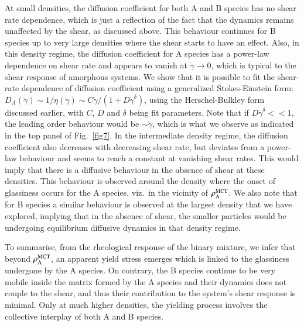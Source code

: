 At small densities, the diffusion coefficient for both A and B species has no shear rate dependence, which is just a reflection of the fact that the dynamics remains unaffected by the shear, as discussed above. This behaviour continues for B species up to very large densities where the shear starts to have an effect.  Also, in this density regime, the diffusion coefficient for A species has a power-law dependence on shear rate and appears to vanish at $\dot{\gamma} \rightarrow 0$, which is typical to the shear response of amorphous systems. We show that it is possible to fit the shear-rate dependence of diffusion coefficient using a generalized Stokes-Einstein form: $D_A(\dot{\gamma}) \sim 1/\eta(\dot{\gamma}) \sim C\dot{\gamma}/(1+D\dot{\gamma}^{\delta})$, using the Herschel-Bulkley form discussed earlier, with $C$, $D$ and $\delta$ being fit parameters. Note that if $D\dot{\gamma}^{\delta} << 1$, the leading order behaviour would be $\sim \dot{\gamma}$, which is what we observe as indicated in the top panel of Fig.~\ref{fig7}. In the intermediate density regime, the diffusion coefficient also decreases with decreasing shear rate, but deviates from a power-law behaviour and seems to reach a constant at vanishing shear rates. This would imply that there is a diffusive behaviour in the absence of shear at these densities. This behaviour is observed around the density where the onset of glassiness occurs for the A species, viz.~in the vicinity of $\rho_{\rm A}^{\rm MCT}$. We also note that for B species a similar behaviour is observed at the largest density that we have explored, implying that in the absence of shear, the smaller particles would be undergoing equilibrium diffusive dynamics in that density regime.

To summarise, from the rheological response of the binary mixture, we infer that beyond $\rho_{\rm A}^{\rm MCT}$, an apparent yield stress emerges which is linked to the glassiness undergone by the A species. On contrary, the B species continue to be very mobile inside the matrix formed by the A species and their dynamics does not couple to the shear, and thus their contribution to the system's shear response is minimal. Only at much higher densities, the yielding process involves the collective interplay of both A and B species.

